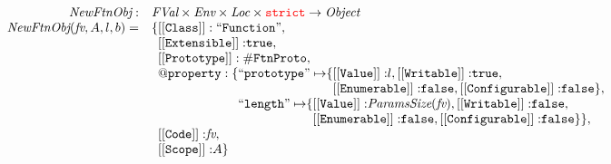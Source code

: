 \[\begin{array}{rl}
\\[2em]




\hf{NewFtnObj} :& \FVal \times \Env \times \Loc \times \strict \rightarrow \Obj \\
\hf{NewFtnObj}(\emph{fv},A,l,b) =&
{\tt \{[[Class]]: ``Function"}, \\%
& \phantom{\{}
{\tt [[Extensible]]:} \true,\\
& \phantom{\{}{\tt [[Prototype]]: \#FtnProto},\\
& \phantom{\{}{\tt @property: \{``prototype"\mapsto}\{{\tt [[Value]]:}l,
 {\tt [[Writable]]:} \true,\\%
& \phantom{\{{\tt @property: \{``prototype"\mapsto}\{}%
 {\tt [[Enumerable]]:} \false,
 {\tt [[Configurable]]:} \false\}, \\

& \phantom{\{ {\tt @property: \{ } }
 {\tt``length"\mapsto}\{{\tt [[Value]]:}\hf{ParamsSize}(\emph{fv}),%
 {\tt [[Writable]]:} \false,\\
& \phantom{\{{\tt @property: \{``length"\mapsto}\{}%
 {\tt [[Enumerable]]:} \false,
 {\tt [[Configurable]]:} \false\}\},\\
 
 
& \phantom{\{}{\tt [[Code]]:} \emph{fv},\\
& \phantom{\{}{\tt [[Scope]]:} {A}\}\\[1em]


\end{array}
\]



